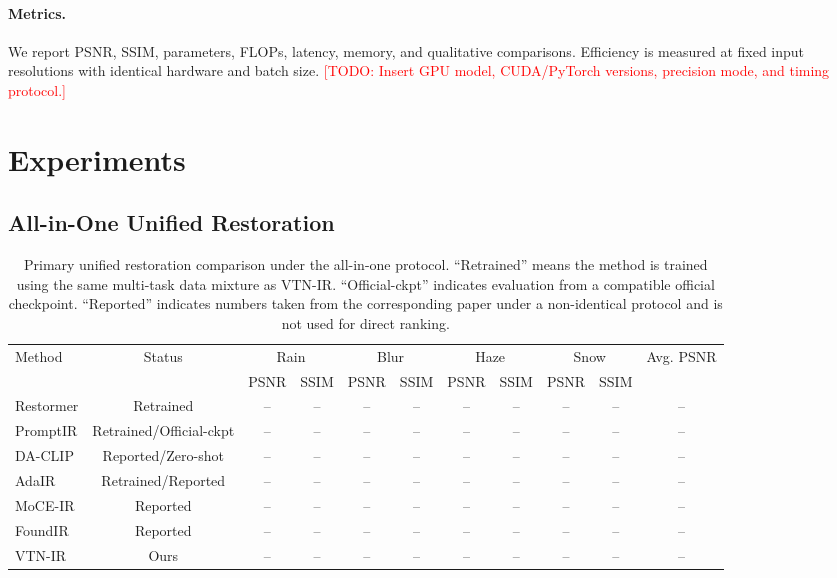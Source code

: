 \documentclass[10pt,twocolumn]{article}
\newcommand{\ours}{VTN-IR}
\newcommand{\todo}[1]{\textcolor{red}{[TODO: #1]}}
\begin{document}
\paragraph{Metrics.}
We report PSNR, SSIM, parameters, FLOPs, latency, memory, and qualitative comparisons. Efficiency is measured at fixed input resolutions with identical hardware and batch size. \todo{Insert GPU model, CUDA/PyTorch versions, precision mode, and timing protocol.}

\section{Experiments}
\subsection{All-in-One Unified Restoration}
\begin{table}[t]
\centering
\caption{Primary unified restoration comparison under the all-in-one protocol. ``Retrained'' means the method is trained using the same multi-task data mixture as \ours. ``Official-ckpt'' indicates evaluation from a compatible official checkpoint. ``Reported'' indicates numbers taken from the corresponding paper under a non-identical protocol and is not used for direct ranking.}
\label{tab:all_in_one}
\small
\begin{tabular}{lcccccccccc}
\toprule
\multirow{2}{*}{Method} & \multirow{2}{*}{Status} & \multicolumn{2}{c}{Rain} & \multicolumn{2}{c}{Blur} & \multicolumn{2}{c}{Haze} & \multicolumn{2}{c}{Snow} & Avg. PSNR \\
 & & PSNR & SSIM & PSNR & SSIM & PSNR & SSIM & PSNR & SSIM & \\
\midrule
Restormer & Retrained & -- & -- & -- & -- & -- & -- & -- & -- & -- \\
PromptIR & Retrained/Official-ckpt & -- & -- & -- & -- & -- & -- & -- & -- & -- \\
DA-CLIP & Reported/Zero-shot & -- & -- & -- & -- & -- & -- & -- & -- & -- \\
AdaIR & Retrained/Reported & -- & -- & -- & -- & -- & -- & -- & -- & -- \\
MoCE-IR & Reported & -- & -- & -- & -- & -- & -- & -- & -- & -- \\
FoundIR & Reported & -- & -- & -- & -- & -- & -- & -- & -- & -- \\
\ours & Ours & -- & -- & -- & -- & -- & -- & -- & -- & -- \\
\bottomrule
\end{tabular}
\end{table}
\end{document}

